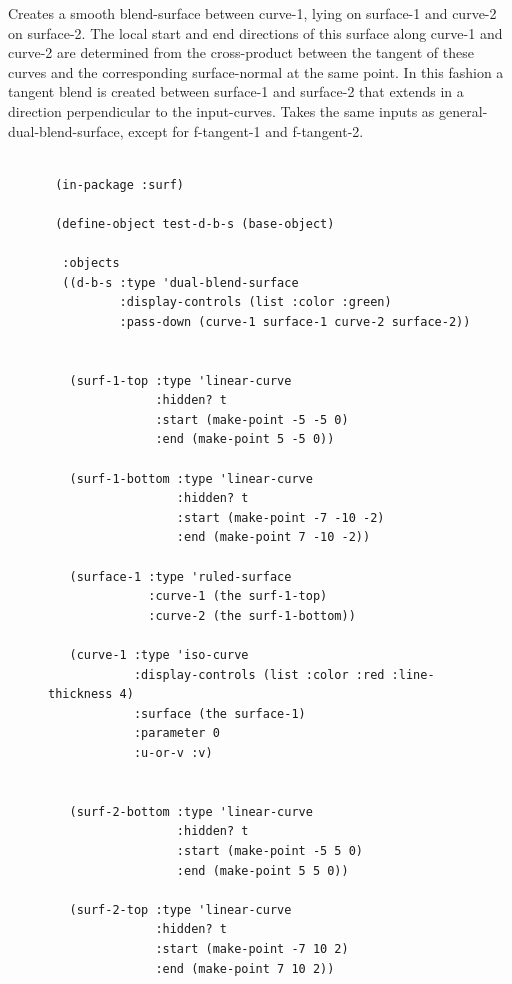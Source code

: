 \documentclass [11pt]{book}
\begin{document}
\begin{itemize}
\begin{description}
Creates a smooth blend-surface between curve-1, lying on surface-1 and curve-2 on surface-2. The local start and end directions of this surface along curve-1 and curve-2 are determined from the cross-product between the tangent of these curves and the corresponding surface-normal at the same point. In this fashion a tangent blend is created between surface-1 and surface-2 that extends in a direction perpendicular to the input-curves. Takes the same inputs as general-dual-blend-surface, except for f-tangent-1 and f-tangent-2.



\end{description}




\begin{figure}
\begin{lrbox}{\boxedverb}
\begin{minipage}{\linewidth}
{\small

\begin{verbatim}

 (in-package :surf)

 (define-object test-d-b-s (base-object)
  
  :objects
  ((d-b-s :type 'dual-blend-surface
          :display-controls (list :color :green)
          :pass-down (curve-1 surface-1 curve-2 surface-2))
                                    
   
   (surf-1-top :type 'linear-curve
               :hidden? t
               :start (make-point -5 -5 0)
               :end (make-point 5 -5 0))
    
   (surf-1-bottom :type 'linear-curve
                  :hidden? t
                  :start (make-point -7 -10 -2)
                  :end (make-point 7 -10 -2))
    
   (surface-1 :type 'ruled-surface
              :curve-1 (the surf-1-top)
              :curve-2 (the surf-1-bottom))
    
   (curve-1 :type 'iso-curve
            :display-controls (list :color :red :line-thickness 4)
            :surface (the surface-1)
            :parameter 0
            :u-or-v :v)
    
    
   (surf-2-bottom :type 'linear-curve
                  :hidden? t
                  :start (make-point -5 5 0)
                  :end (make-point 5 5 0))
    
   (surf-2-top :type 'linear-curve
               :hidden? t
               :start (make-point -7 10 2)
               :end (make-point 7 10 2))
    

\end{verbatim}}
\end{minipage}
\end{lrbox}
\end{figure}
\end{itemize}
\end{document}
